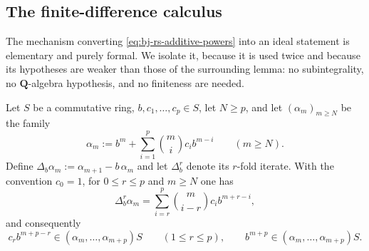 \subsection{The finite-difference calculus}
\label{sec:ch44-finite-differences}

The mechanism converting \eqref{eq:bj-rs-additive-powers} into an ideal
statement is elementary and purely formal.  We isolate it, because it is
used twice and because its hypotheses are weaker than those of the
surrounding lemma: no subintegrality, no $\mathbf Q$-algebra hypothesis,
and no finiteness are needed.

\begin{lemma}
\label{lem:ch44-finite-differences}
Let $S$ be a commutative ring, $b,c_1,\ldots,c_p\in S$, let $N\ge p$,
and let $(\alpha_m)_{m\ge N}$ be the family
\[
 \alpha_m:=b^m+\sum_{i=1}^p\binom mic_ib^{m-i}
 \qquad(m\ge N).
\]
Define $\Delta_b\alpha_m:=\alpha_{m+1}-b\,\alpha_m$ and let
$\Delta_b^r$ denote its $r$-fold iterate.  With the convention $c_0=1$,
for $0\le r\le p$ and $m\ge N$ one has
\[
 \Delta_b^r\alpha_m
 =\sum_{i=r}^p\binom m{i-r}c_ib^{m+r-i},
\]
and consequently
\[
 c_rb^{m+p-r}\in(\alpha_m,\ldots,\alpha_{m+p})S
 \qquad(1\le r\le p),
 \qquad
 b^{m+p}\in(\alpha_m,\ldots,\alpha_{m+p})S .
\]
\end{lemma}

